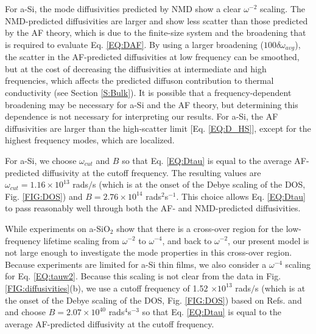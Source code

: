\documentclass[aps,prb,onecolumn,preprint,superscriptaddress,footinbib,amsmath,amssymb,floatfix]{revtex4}
\begin{document}
For a-Si, the mode diffusivities predicted by NMD 
show a clear $\omega^{-2}$ scaling. 
The NMD-predicted diffusivities are larger and show less 
scatter than those predicted by the AF theory, which is due to 
the finite-size system and the broadening that is 
required to evaluate 
Eq. \eqref{EQ:DAF}.\cite{feldman_thermal_1993} By using a larger 
broadening ($100\delta\omega_{avg}$), the scatter 
in the AF-predicted 
diffusivities at low frequency can be smoothed, but at the cost of 
decreasing the diffusivities at intermediate and 
high frequencies, which 
affects the predicted diffuson contribution to thermal 
conductivity (see Section \ref{S:Bulk}). 
It is possible that a frequency-dependent broadening may be 
necessary for a-Si and the AF theory,  
but determining this dependence is not necessary for 
interpreting our results. 
For a-Si, the AF diffusivities are 
larger than the high-scatter limit [Eq. \eqref{EQ:D_HS}], 
except for the highest frequency modes, which are localized.
\cite{feldman_thermal_1993} 

For a-Si, we choose $\omega_{cut}$  
and $B$ so that Eq. \eqref{EQ:Dtau} is equal 
to the average AF-predicted diffusivity at the cutoff frequency. 
The resulting values are 
$\omega_{cut}=1.16 \times 10^{13}$ rads$/$s (which is at the onset 
of the Debye scaling of the DOS, Fig. \ref{FIG:DOS})  
and $B=2.76\times10^{14}$ rads$^2$s$^{-1}$. This choice 
allows Eq. \eqref{EQ:Dtau} to pass reasonably well through both 
the AF- and NMD-predicted diffusivities. 

While experiments on a-SiO$_2$ show that there is a cross-over 
region for the low-frequency lifetime scaling from $\omega^{-2}$ to 
$\omega^{-4}$,\cite{masciovecchio_evidence_2006} 
and back to $\omega^{-2}$,
\cite{masciovecchio_evidence_2006,baldi_sound_2010,
baldi_elastic_2011,baldi_emergence_2013} our present model is not 
large enough to investigate the mode properties 
in this cross-over region. 
Because experiments are limited for a-Si thin films, 
\cite{hondongwa_ultrasonic_2011} 
we also consider a $\omega^{-4}$ scaling 
for Eq. \eqref{EQ:tauw2}. Because this scaling is not clear from 
the data in Fig. \ref{FIG:diffusivities}(b),  
we use a cutoff frequency of 1.52 $\times 10^{13}$ rads$/$s 
(which is at the onset 
of the Debye scaling of the DOS, Fig. \ref{FIG:DOS}) 
based on Refs.  and 
and choose $B=2.07\times10^{40}$ rads$^4$s$^{-3}$ so that 
Eq. \eqref{EQ:Dtau} is equal to the average 
AF-predicted diffusivity at the cutoff frequency. 
\end{document}
